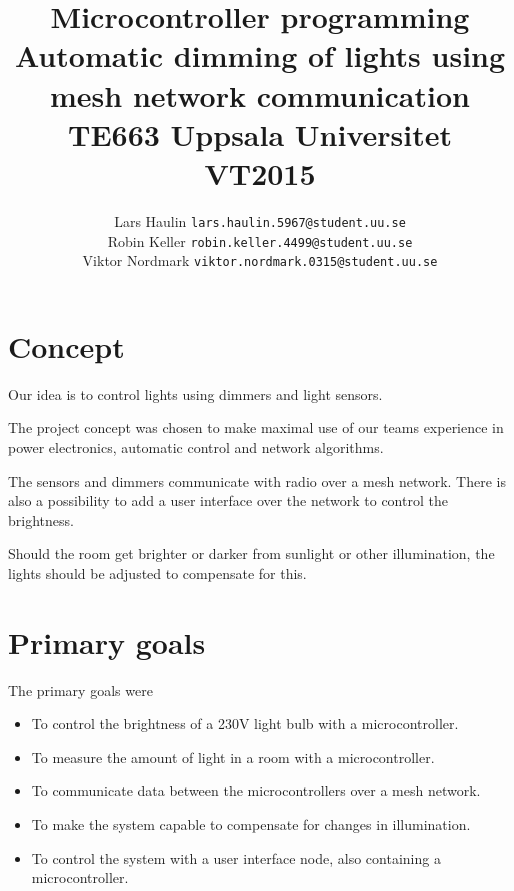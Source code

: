 \documentclass[11pt]{article}
\begin{document}
	\title{Microcontroller programming \\
		Automatic dimming of lights using mesh network communication\\
		TE663 Uppsala Universitet VT2015}
	\date{}
	\author{}
	\author{Lars Haulin \texttt{lars.haulin.5967@student.uu.se}\\
		Robin Keller \texttt{robin.keller.4499@student.uu.se}\\
		Viktor Nordmark \texttt{viktor.nordmark.0315@student.uu.se}}
	\maketitle
	

	\section{Concept}
	
	Our idea is to control lights using dimmers and light sensors.

   The project concept was chosen to make maximal use of our teams experience
   in power electronics, automatic control and network algorithms.

	The sensors and dimmers communicate with radio over a mesh network.
	There is also a possibility to add a user interface over the network to control
	the brightness.
	
	Should the room get brighter or darker from sunlight or other illumination,
	the lights should be adjusted to compensate for this.
	
	\section{Primary goals}

   The primary goals were
	
	\begin{itemize}
		\item To control the brightness of a 230V light bulb with a microcontroller.
		\item To measure the amount of light in a room with a microcontroller.
		\item To communicate data between the microcontrollers over a mesh network.
		\item To make the system capable to compensate for changes in illumination.
		\item To control the system with a user interface node, also containing
		a microcontroller.
	\end{itemize}
	
\end{document}
